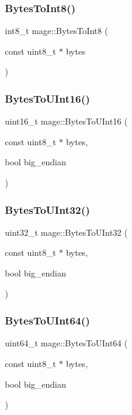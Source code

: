 \subsubsection{\texorpdfstring{Bytes\+To\+Int8()}{BytesToInt8()}}
{\footnotesize\ttfamily int8\+\_\+t mage\+::\+Bytes\+To\+Int8 (\begin{DoxyParamCaption}\item[{const uint8\+\_\+t $\ast$}]{bytes }\end{DoxyParamCaption})}

\hypertarget{namespacemage_ae7ac42dd62471c5badcd2f6c49b30e5b}{}\label{namespacemage_ae7ac42dd62471c5badcd2f6c49b30e5b} 
\subsubsection{\texorpdfstring{Bytes\+To\+U\+Int16()}{BytesToUInt16()}}
{\footnotesize\ttfamily uint16\+\_\+t mage\+::\+Bytes\+To\+U\+Int16 (\begin{DoxyParamCaption}\item[{const uint8\+\_\+t $\ast$}]{bytes,  }\item[{bool}]{big\+\_\+endian }\end{DoxyParamCaption})}

\hypertarget{namespacemage_a46a019c7f927a6f559b36a8b5c01ab9c}{}\label{namespacemage_a46a019c7f927a6f559b36a8b5c01ab9c} 
\subsubsection{\texorpdfstring{Bytes\+To\+U\+Int32()}{BytesToUInt32()}}
{\footnotesize\ttfamily uint32\+\_\+t mage\+::\+Bytes\+To\+U\+Int32 (\begin{DoxyParamCaption}\item[{const uint8\+\_\+t $\ast$}]{bytes,  }\item[{bool}]{big\+\_\+endian }\end{DoxyParamCaption})}

\hypertarget{namespacemage_a93f1f8baabf199005ea96e0a2b6941e3}{}\label{namespacemage_a93f1f8baabf199005ea96e0a2b6941e3} 
\subsubsection{\texorpdfstring{Bytes\+To\+U\+Int64()}{BytesToUInt64()}}
{\footnotesize\ttfamily uint64\+\_\+t mage\+::\+Bytes\+To\+U\+Int64 (\begin{DoxyParamCaption}\item[{const uint8\+\_\+t $\ast$}]{bytes,  }\item[{bool}]{big\+\_\+endian }\end{DoxyParamCaption})}

